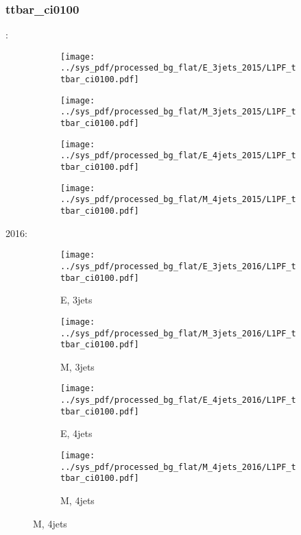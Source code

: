 \documentclass{beamer}
\begin{document}
\begin{frame}
\frametitle{ttbar_ci0100}
\fontsize{5}{1}:
\begin{figure}
\centering
\begin{subfigure}[b]{0.24\textwidth}
\texttt{[image: ../sys\_pdf/processed\_bg\_flat/E\_3jets\_2015/L1PF\_ttbar\_ci0100.pdf]}
\end{subfigure}
\begin{subfigure}[b]{0.24\textwidth}
\texttt{[image: ../sys\_pdf/processed\_bg\_flat/M\_3jets\_2015/L1PF\_ttbar\_ci0100.pdf]}
\end{subfigure}
\begin{subfigure}[b]{0.24\textwidth}
\texttt{[image: ../sys\_pdf/processed\_bg\_flat/E\_4jets\_2015/L1PF\_ttbar\_ci0100.pdf]}
\end{subfigure}
\begin{subfigure}[b]{0.24\textwidth}
\texttt{[image: ../sys\_pdf/processed\_bg\_flat/M\_4jets\_2015/L1PF\_ttbar\_ci0100.pdf]}
\end{subfigure}
\end{figure}
2016:
\begin{figure}
\centering
\begin{subfigure}[b]{0.24\textwidth}
\texttt{[image: ../sys\_pdf/processed\_bg\_flat/E\_3jets\_2016/L1PF\_ttbar\_ci0100.pdf]}
\captionsetup{font=tiny}
\caption{E, 3jets}
\end{subfigure}
\begin{subfigure}[b]{0.24\textwidth}
\texttt{[image: ../sys\_pdf/processed\_bg\_flat/M\_3jets\_2016/L1PF\_ttbar\_ci0100.pdf]}
\captionsetup{font=tiny}
\caption{M, 3jets}
\end{subfigure}
\begin{subfigure}[b]{0.24\textwidth}
\texttt{[image: ../sys\_pdf/processed\_bg\_flat/E\_4jets\_2016/L1PF\_ttbar\_ci0100.pdf]}
\captionsetup{font=tiny}
\caption{E, 4jets}
\end{subfigure}
\begin{subfigure}[b]{0.24\textwidth}
\texttt{[image: ../sys\_pdf/processed\_bg\_flat/M\_4jets\_2016/L1PF\_ttbar\_ci0100.pdf]}
\captionsetup{font=tiny}
\caption{M, 4jets}
\end{subfigure}
\end{figure}
\end{frame}
\end{document}
